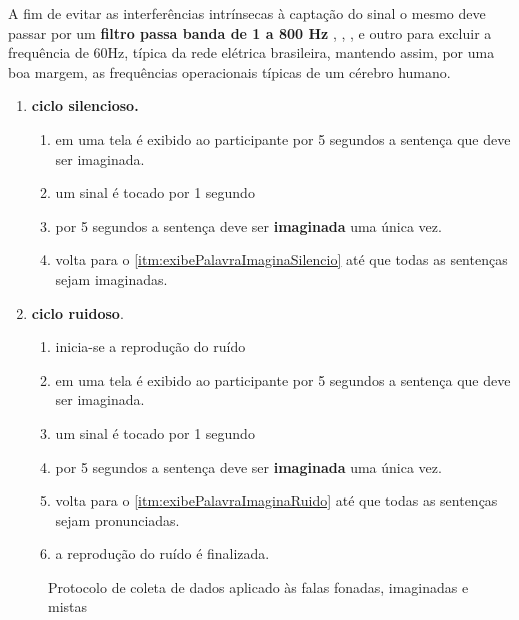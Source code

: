  			    \par A fim de evitar as interferências intrínsecas à captação do sinal o mesmo deve passar por um \textbf{filtro passa banda de 1 a 800 Hz} \cite{JALALYBIDGOLY2020101788}, \cite{Moffett2017}, \cite{hfreOscEngel}, e outro para excluir a frequência de 60Hz, típica da rede elétrica brasileira, mantendo assim, por uma boa margem, as frequências operacionais típicas de um cérebro humano.
		    	
			    \begin{enumerate}
			    	\item \textbf{ciclo silencioso.}
			    	\begin{enumerate}
			    		\item em uma tela é exibido ao participante por 5 segundos a sentença que deve ser imaginada.\label{itm:exibePalavraImaginaSilencio}
			    		\item um sinal é tocado por 1 segundo
			    		\item por 5 segundos a sentença deve ser \textbf{imaginada} uma única vez.
			    		\item volta para o \autoref{itm:exibePalavraImaginaSilencio} até que todas as sentenças sejam imaginadas.
			    	\end{enumerate}
			    	\item \textbf{ciclo ruidoso}.
			    	\begin{enumerate}
			    		\item inicia-se a reprodução do ruído
			    		\item em uma tela é exibido ao participante por 5 segundos a sentença que deve ser imaginada.\label{itm:exibePalavraImaginaRuido}
			    		\item um sinal é tocado por 1 segundo
			    		\item por 5 segundos a sentença deve ser \textbf{imaginada} uma única vez.
			    		\item volta para o \autoref{itm:exibePalavraImaginaRuido} até que todas as sentenças sejam pronunciadas.
			    		\item a reprodução do ruído é finalizada.
			    	\end{enumerate}
			    \end{enumerate}
			    
				\begin{figure}[H]
					\centering
					\caption[Protocolo de coleta de dados]{Protocolo de coleta de dados aplicado às falas fonadas, imaginadas e mistas}
				\end{figure}
				
